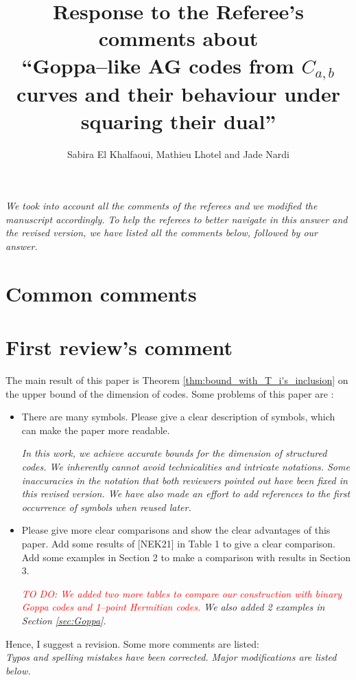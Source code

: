 \documentclass[12pt,a4paper]{amsart}
\title[Goppa--like AG codes from $C_{a,b}$ curves and their behaviour under squaring their dual]{Response to the Referee's comments about  \\ ``Goppa--like AG codes from $C_{a,b}$ curves and their behaviour under squaring their dual''}
\author{Sabira El Khalfaoui, Mathieu Lhotel and Jade Nardi}
\newcommand\TODO[1]{\textcolor{red}{TO DO: #1}}
\begin{document}
\maketitle

\textit{We took into account all the comments of the referees and we modified the manuscript accordingly. To help the referees to better navigate in this answer and the revised version, we have listed all the comments below, followed by our answer.} 

\section*{Common comments}
 
\section*{First review's comment}

The main result of this paper is Theorem \ref{thm:bound_with_T_i's_inclusion} on the upper bound of the dimension of codes. Some problems
of this paper are :
\begin{itemize}
\item  There are many symbols. Please give a clear description of symbols, which can make the paper more readable.

\textit{In this work, we achieve accurate bounds for the dimension of structured codes. We inherently cannot avoid technicalities and intricate notations. Some inaccuracies in the notation that both reviewers pointed out have been fixed in this revised version. We have also made an effort to add references to the first occurrence of symbols when reused later.}


\item  Please give more clear comparisons and show the clear advantages of this paper. Add some results of [NEK21] in Table 1 to give a clear comparison. Add some examples in Section 2 to make a comparison with results in Section 3. 

\textit{\TODO{We added two more tables to compare our construction with binary Goppa codes and 1--point Hermitian codes.} We also added 2 examples in Section \ref{sec:Goppa}.}

\end{itemize}

Hence, I suggest a revision. Some more comments are listed: \\

\textit{Typos and spelling mistakes have been corrected. Major modifications are listed below.} \\
\end{document}

